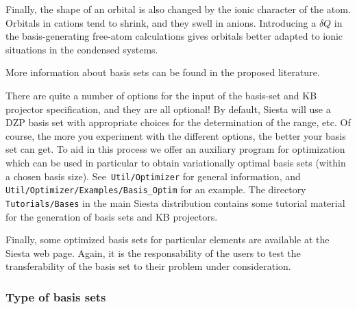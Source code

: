 \documentclass[11pt]{article}
\begin{document}
Finally, the shape of an orbital is also changed by the ionic
character of the atom.  Orbitals in cations tend to shrink, and they
swell in anions.  Introducing a $\delta Q$ in the basis-generating
free-atom calculations gives orbitals better adapted to ionic
situations in the condensed systems.

More information about basis sets can be found in the proposed
literature.


\noindent

There are quite a number of options for the input of the basis-set and
KB projector specification, and they are all optional! By default,
{\sc Siesta} will use a DZP basis set with appropriate choices for the
determination of the range, etc. Of course, the more you experiment
with the different options, the better your basis set can get. To aid
in this process we offer an auxiliary program for optimization which
can be used in particular to obtain variationally optimal basis sets
(within a chosen basis size). See {\tt Util/Optimizer}
for general information, and {\tt Util/Optimizer/Examples/Basis\_Optim}
for an example. The directory {\tt Tutorials/Bases} in the main {\sc Siesta
distribution} contains some tutorial material for the generation of
basis sets and KB projectors.

Finally, some optimized basis sets for particular elements are
available at the {\sc Siesta} web page.  Again, it is the
responsability of the users to test the transferability of the basis
set to their problem under consideration.


\subsubsection{Type of basis sets}
\end{document}
